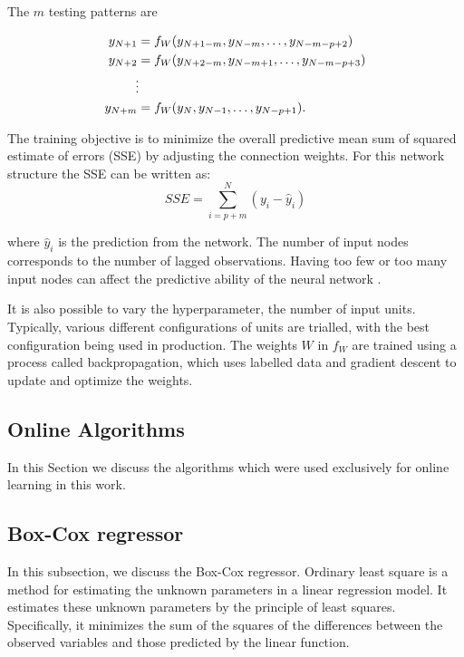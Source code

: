The $m$ testing patterns are 

\begin{align}
y_{N+1} & =f_{W}(y_{N+1-m}, y_{N-m},\ldots,y_{N-m-p+2})\\
y_{N+2} & =f_{W}(y_{N+2-m}, y_{N-m+1},\ldots,y_{N-m-p+3})\\
&\vdotswithin  \notag \\
y_{N+m} & =f_{W}(y_{N},y_{N-1},\ldots,y_{N-p+1}).
\end{align}

The training objective is to minimize the overall predictive mean sum of squared estimate of errors (SSE) by adjusting the connection weights. For this network structure the SSE can be written as:
\begin{equation}
SSE = \sum_{i=p+m}^N(y_i-\hat{y}_i)
\end{equation}

\noindent where $\hat{y}_i$ is the prediction from the network. The number of input nodes corresponds to the number of lagged observations. Having too few or too many input nodes can affect the predictive ability of the neural network \cite{Pao2007}.

It is also possible to vary the hyperparameter, the number of input units. Typically, various different configurations of units are trialled, with the best configuration being used in production. The weights $W$ in $f_W$ are trained using a process called backpropagation, which uses labelled data and gradient descent to update and optimize the weights.

\subsection{Online Algorithms}

In this Section we discuss the algorithms which were used exclusively for online learning in this work.

\subsection{Box-Cox regressor}

In this subsection, we discuss the Box-Cox regressor. Ordinary least square is a method for estimating the unknown parameters in a linear regression model. It estimates these unknown parameters by the principle of least squares. Specifically, it minimizes the sum of the squares of the differences between the observed variables and those predicted by the linear function.

